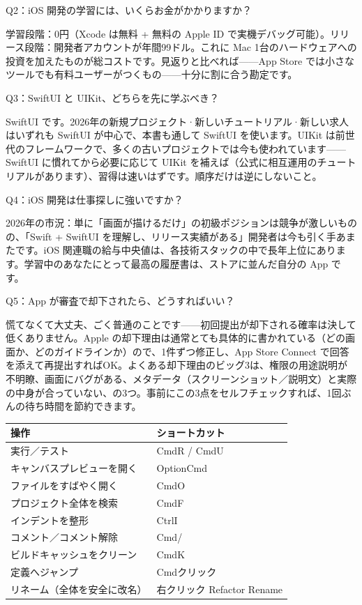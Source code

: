 Q2：iOS 開発の学習には、いくらお金がかかりますか？

学習段階：0円（Xcode は無料 + 無料の Apple ID で実機デバッグ可能）。リリース段階：開発者アカウントが年間99ドル。これに Mac 1台のハードウェアへの投資を加えたものが総コストです。見返りと比べれば——App Store では小さなツールでも有料ユーザーがつくもの——十分に割に合う勘定です。

Q3：SwiftUI と UIKit、どちらを先に学ぶべき？

SwiftUI です。2026年の新規プロジェクト·新しいチュートリアル·新しい求人はいずれも SwiftUI が中心で、本書も通して SwiftUI を使います。UIKit は前世代のフレームワークで、多くの古いプロジェクトでは今も使われています——SwiftUI に慣れてから必要に応じて UIKit を補えば（公式に相互運用のチュートリアルがあります）、習得は速いはずです。順序だけは逆にしないこと。

Q4：iOS 開発は仕事探しに強いですか？

2026年の市況：単に「画面が描けるだけ」の初級ポジションは競争が激しいものの、「Swift + SwiftUI を理解し、リリース実績がある」開発者は今も引く手あまたです。iOS 関連職の給与中央値は、各技術スタックの中で長年上位にあります。学習中のあなたにとって最高の履歴書は、ストアに並んだ自分の App です。

Q5：App が審査で却下されたら、どうすればいい？

慌てなくて大丈夫、ごく普通のことです——初回提出が却下される確率は決して低くありません。Apple の却下理由は通常とても具体的に書かれている（どの画面か、どのガイドラインか）ので、1件ずつ修正し、App Store Connect で回答を添えて再提出すればOK。よくある却下理由のビッグ3は、権限の用途説明が不明瞭、画面にバグがある、メタデータ（スクリーンショット／説明文）と実際の中身が合っていない、の3つ。事前にこの3点をセルフチェックすれば、1回ぶんの待ち時間を節約できます。


\begin{center}
\begin{tabularx}{\linewidth}{|X|X|}
\hline
\textbf{操作} & \textbf{ショートカット} \tabularnewline
\hline
実行／テスト & CmdR / CmdU \tabularnewline
キャンバスプレビューを開く & OptionCmd \tabularnewline
ファイルをすばやく開く & CmdO \tabularnewline
プロジェクト全体を検索 & CmdF \tabularnewline
インデントを整形 & CtrlI \tabularnewline
コメント／コメント解除 & Cmd/ \tabularnewline
ビルドキャッシュをクリーン & CmdK \tabularnewline
定義へジャンプ & Cmdクリック \tabularnewline
リネーム（全体を安全に改名） & 右クリック Refactor Rename \tabularnewline
\hline
\end{tabularx}
\end{center}

